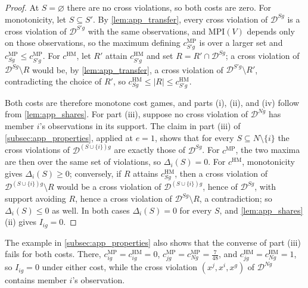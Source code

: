 \documentclass[11 pt]{article}
\begin{document}
\begin{proof}
At $S = \varnothing$ there are no cross violations, so both costs are zero. For monotonicity, let $S \subseteq S'$. By \autoref{lem:app_transfer}, every cross violation of $\mathcal{D}^{Sg}$ is a cross violation of $\mathcal{D}^{S'g}$ with the same observations, and $\mathrm{MPI}(V)$ depends only on those observations, so the maximum defining $c^{\mathrm{MP}}_{S'g}$ is over a larger set and $c^{\mathrm{MP}}_{Sg} \leq c^{\mathrm{MP}}_{S'g}$. For $c^{\mathrm{HM}}$, let $R'$ attain $c^{\mathrm{HM}}_{S'g}$ and set $R = R' \cap \mathcal{D}^{Sg}$; a cross violation of $\mathcal{D}^{Sg} \setminus R$ would be, by \autoref{lem:app_transfer}, a cross violation of $\mathcal{D}^{S'g} \setminus R'$, contradicting the choice of $R'$, so $c^{\mathrm{HM}}_{Sg} \leq |R| \leq c^{\mathrm{HM}}_{S'g}$.

Both costs are therefore monotone cost games, and parts (i), (ii), and (iv) follow from \autoref{lem:app_shares}. For part (iii), suppose no cross violation of $\mathcal{D}^{Ng}$ has member $i$'s observations in its support. The claim in part (iii) of \autoref{subsec:app_properties}, applied at $e = 1$, shows that for every $S \subseteq N \setminus \{i\}$ the cross violations of $\mathcal{D}^{(S \cup \{i\})g}$ are exactly those of $\mathcal{D}^{Sg}$. For $c^{\mathrm{MP}}$, the two maxima are then over the same set of violations, so $\Delta_{i}(S) = 0$. For $c^{\mathrm{HM}}$, monotonicity gives $\Delta_{i}(S) \geq 0$; conversely, if $R$ attains $c^{\mathrm{HM}}_{Sg}$, then a cross violation of $\mathcal{D}^{(S \cup \{i\})g} \setminus R$ would be a cross violation of $\mathcal{D}^{(S \cup \{i\})g}$, hence of $\mathcal{D}^{Sg}$, with support avoiding $R$, hence a cross violation of $\mathcal{D}^{Sg} \setminus R$, a contradiction; so $\Delta_{i}(S) \leq 0$ as well. In both cases $\Delta_{i}(S) = 0$ for every $S$, and \autoref{lem:app_shares}(ii) gives $I_{ig} = 0$.
\end{proof}

The example in \autoref{subsec:app_properties} also shows that the converse of part (iii) fails for both costs. There, $c^{\mathrm{MP}}_{ig} = c^{\mathrm{HM}}_{ig} = 0$, $c^{\mathrm{MP}}_{jg} = c^{\mathrm{MP}}_{Ng} = \tfrac{7}{48}$, and $c^{\mathrm{HM}}_{jg} = c^{\mathrm{HM}}_{Ng} = 1$, so $I_{ig} = 0$ under either cost, while the cross violation $(x^{j}, x^{i}, x^{g})$ of $\mathcal{D}^{Ng}$ contains member $i$'s observation.

\end{document}
